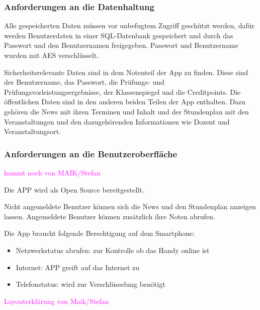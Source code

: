 \subsubsection{\textbf{Anforderungen an die Datenhaltung}}

Alle gespeicherten Daten müssen vor unbefugtem Zugriff geschützt werden, dafür werden Benutzerdaten in einer \acs{SQL}-Datenbank gespeichert und durch das Passwort und den Benutzernamen freigegeben. Passwort und Benutzername wurden mit \acs{AES} verschlüsselt.

Sicherheitsrelevante Daten sind in dem Notenteil der App zu finden. Diese sind der Benutzername, das Passwort, die Prüfungs- und Prüfungsvorleistungsergebnisse, der Klassenspiegel und die Creditpoints.
Die öffentlichen Daten sind in den anderen beiden Teilen der App enthalten.
Dazu gehören die News mit ihren Terminen und Inhalt und der Stundenplan mit den Veranstaltungen und den dazugehörenden Informationen wie Dozent und Veranstaltungsort.


\subsubsection{\textbf{Anforderungen an die Benutzeroberfläche}}



\textcolor{magenta}{kommt noch von MAIK/Stefan}





Die APP wird als Open Source bereitgestellt.

Nicht angemeldete Benutzer können sich die News und den Stundenplan anzeigen lassen. Angemeldete Benutzer können zusätzlich ihre Noten abrufen.

Die App braucht folgende Berechtigung auf dem Smartphone:
\begin{itemize}
	\item Netzwerkstatus abrufen: zur Kontrolle ob das Handy online ist
	\item Internet: APP greift auf das Internet zu
	\item Telefonstatus: wird zur Verschlüsselung benötigt
\end{itemize}




\textcolor{magenta}{Layouterklärung von Maik/Stefan}





